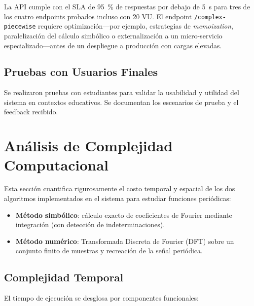 La API cumple con el SLA de \SI{95}{\percent} de respuestas por debajo de
\SI{5}{\second} para tres de los cuatro endpoints probados incluso con 20 VU.
El endpoint \texttt{/complex-piecewise} requiere optimización—por ejemplo,
estrategias de \textit{memoization}, paralelización del cálculo simbólico o
externalización a un micro-servicio especializado—antes de un despliegue a
producción con cargas elevadas.


\subsection{Pruebas con Usuarios Finales}
Se realizaron pruebas con estudiantes para validar la usabilidad y utilidad del sistema en contextos educativos. Se documentan los escenarios de prueba y el feedback recibido.

\section{Análisis de Complejidad Computacional}

Esta sección cuantifica rigurosamente el costo temporal y espacial de los
dos algoritmos implementados en el sistema para estudiar funciones
periódicas:

\begin{itemize}
	\item \textbf{Método simbólico}: cálculo exacto de coeficientes de
	Fourier mediante integración (con detección de
	indeterminaciones).
	\item \textbf{Método numérico}: Transformada Discreta de Fourier (DFT)
	sobre un conjunto finito de muestras y recreación de la señal
	periódica.
\end{itemize}

\subsection{Complejidad Temporal}

El tiempo de ejecución se desglosa por componentes funcionales:

